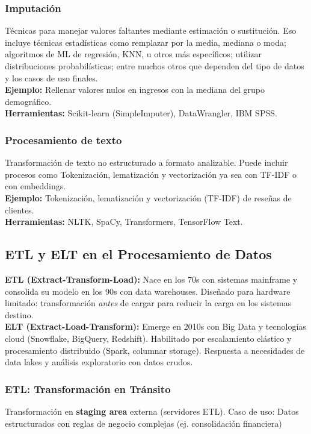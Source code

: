 \documentclass[12pt]{book}
\begin{document}
\subsubsection{Imputación}
Técnicas para manejar valores faltantes mediante estimación o sustitución. Eso incluye técnicas 
estadísticas como remplazar por la media, mediana o moda; algoritmos de ML de regresión, KNN, u 
otros más específicos; utilizar distribuciones probabilísticas; entre muchos otros que dependen 
del tipo de datos y los casos de uso finales.\\

\textbf{Ejemplo:} Rellenar valores nulos en ingresos con la mediana del grupo demográfico.\\

\textbf{Herramientas:} Scikit-learn (SimpleImputer), DataWrangler, IBM SPSS.

\subsubsection{Procesamiento de texto}
Transformación de texto no estructurado a formato analizable. Puede incluir procesos como Tokenización, lematización y vectorización ya sea con TF-IDF o con embeddings.\\
\textbf{Ejemplo:} Tokenización, lematización y vectorización (TF-IDF) de reseñas de clientes.\\
\textbf{Herramientas:} NLTK, SpaCy, Transformers, TensorFlow Text.


\subsection{ETL y ELT en el Procesamiento de Datos}
\textbf{ETL (Extract-Transform-Load):} Nace en los 70s con sistemas mainframe y consolida 
su modelo en los 90s con data warehouses. Diseñado para hardware limitado: transformación 
\textit{antes} de cargar para reducir la carga en los sistemas destino. \\
\textbf{ELT (Extract-Load-Transform):} Emerge en 2010s con Big Data y tecnologías 
cloud (Snowflake, BigQuery, Redshift). Habilitado por escalamiento elástico y procesamiento 
distribuido (Spark, columnar storage). Respuesta a necesidades de data lakes y análisis 
exploratorio con datos crudos.

\subsubsection{ETL: Transformación en Tránsito}
Transformación en \textbf{staging area} externa (servidores ETL). Caso de uso: Datos 
estructurados con reglas de negocio complejas (ej. consolidación financiera)
\end{document}

